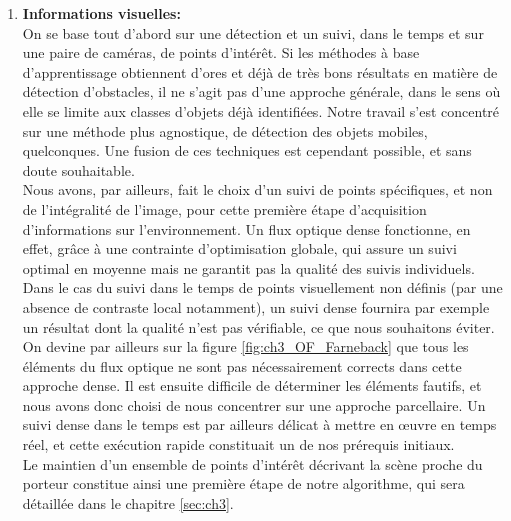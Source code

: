\begin{enumerate}
	\item{\textbf{Informations visuelles:}\\}
	On se base tout d'abord sur une détection et un suivi, dans le temps et sur une paire de caméras, de points d'intérêt. Si les méthodes à base d'apprentissage obtiennent d'ores et déjà de très bons résultats en matière de détection d'obstacles, il ne s'agit pas d'une approche générale, dans le sens où elle se limite aux classes d'objets déjà identifiées. Notre travail s'est concentré sur une méthode plus agnostique, de détection des objets mobiles, quelconques. Une fusion de ces techniques est cependant possible, et sans doute souhaitable. \\
	Nous avons, par ailleurs, fait le choix d'un suivi de points spécifiques, et non de l'intégralité de l'image, pour cette première étape d'acquisition d'informations sur l'environnement. Un flux optique dense fonctionne, en effet, grâce à une contrainte d'optimisation globale, qui assure un suivi optimal en moyenne mais ne garantit pas la qualité des suivis individuels. Dans le cas du suivi dans le temps de points visuellement non définis (par une absence de contraste local notamment), un suivi dense fournira par exemple un résultat dont la qualité n'est pas vérifiable, ce que nous souhaitons éviter. On devine par ailleurs sur la figure \ref{fig:ch3_OF_Farneback} que tous les éléments du flux optique ne sont pas nécessairement corrects dans cette approche dense. Il est ensuite difficile de déterminer les éléments fautifs, et nous avons donc choisi de nous concentrer sur une approche parcellaire. Un suivi dense dans le temps est par ailleurs délicat à mettre en œuvre en temps réel, et cette exécution rapide constituait un de nos prérequis initiaux.\\
	Le maintien d'un ensemble de points d'intérêt décrivant la scène proche du porteur constitue ainsi une première étape de notre algorithme, qui sera détaillée dans le chapitre \ref{sec:ch3}.\\
	

\end{enumerate}
